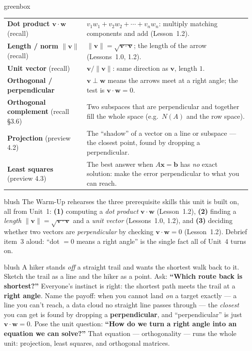 \documentclass[10pt]{article}
\newcommand{\vv}{\mathbf{v}}
\newcommand{\ww}{\mathbf{w}}
\begin{document}
\begin{skillbox}{greenbox}
\renewcommand{\arraystretch}{1.3}
\begin{tabularx}{\linewidth}{@{}l X@{}}
\textbf{Dot product $\vv\cdot\ww$} (recall) & $v_1w_1+v_2w_2+\cdots+v_nw_n$: multiply matching components and add (Lesson~1.2). \\
\textbf{Length / norm $\|\vv\|$} (recall) & $\|\vv\|=\sqrt{\vv\cdot\vv}$; the length of the arrow (Lessons~1.0, 1.2). \\
\textbf{Unit vector} (recall) & $\vv/\|\vv\|$: same direction as $\vv$, length $1$. \\
\textbf{Orthogonal / perpendicular} & $\vv\perp\ww$ means the arrows meet at a right angle; the test is $\vv\cdot\ww=0$. \\
\textbf{Orthogonal complement} (recall §3.6) & Two subspaces that are perpendicular and together fill the whole space (e.g.\ $N(A)$ and the row space). \\
\textbf{Projection} (preview 4.2) & The ``shadow'' of a vector on a line or subspace --- the closest point, found by dropping a perpendicular. \\
\textbf{Least squares} (preview 4.3) & The best answer when $A\mathbf x=\mathbf b$ has \emph{no} exact solution: make the error perpendicular to what you can reach. \\
\end{tabularx}
\end{skillbox}

\begin{fixedskillbox}{blush}
    The Warm-Up rehearses the three prerequisite skills this unit is built on, all from Unit~1:
    \textbf{(1)} computing a \emph{dot product} $\vv\cdot\ww$ (Lesson~1.2),
    \textbf{(2)} finding a \emph{length} $\|\vv\|=\sqrt{\vv\cdot\vv}$ and a \emph{unit vector}
    (Lessons~1.0, 1.2), and
    \textbf{(3)} deciding whether two vectors are \emph{perpendicular} by checking
    $\vv\cdot\ww=0$ (Lesson~1.2). Debrief item~3 aloud: ``dot $=0$ means a right angle'' is the
    single fact all of Unit~4 turns on.
\end{fixedskillbox}

\begin{skillbox}[Hook]{blush}
    A hiker stands \emph{off} a straight trail and wants the shortest walk back to it. Sketch the
    trail as a line and the hiker as a point. Ask: \textbf{``Which route back is shortest?''}
    Everyone's instinct is right: the shortest path meets the trail at a \textbf{right angle}. Name
    the payoff: when you cannot land \emph{on} a target exactly --- a line you can't reach, a data
    cloud no straight line passes through --- the \emph{closest} you can get is found by dropping a
    \textbf{perpendicular}, and ``perpendicular'' is just $\vv\cdot\ww=0$. Pose the unit question:
    \textbf{``How do we turn a right angle into an equation we can solve?''} That equation ---
    orthogonality --- runs the whole unit: projection, least squares, and orthogonal matrices.
\end{skillbox}
\end{document}
